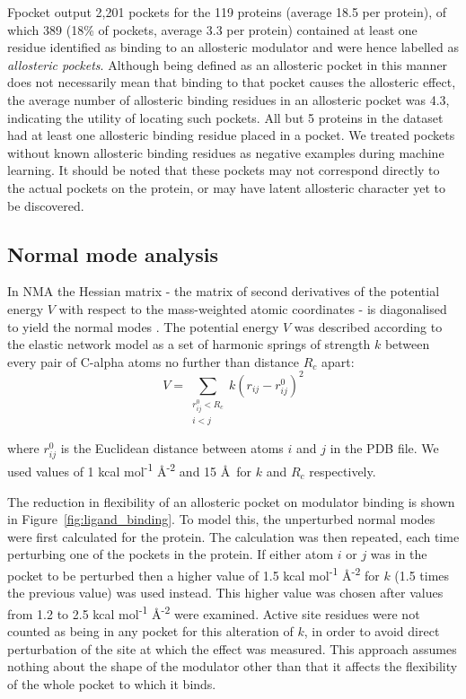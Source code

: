 Fpocket output 2,201 pockets for the 119 proteins (average 18.5 per protein), of which 389 (18\% of pockets, average 3.3 per protein) contained at least one residue identified as binding to an allosteric modulator and were hence labelled as \emph{allosteric pockets}.
Although being defined as an allosteric pocket in this manner does not necessarily mean that binding to that pocket causes the allosteric effect, the average number of allosteric binding residues in an allosteric pocket was 4.3, indicating the utility of locating such pockets.
All but 5 proteins in the dataset had at least one allosteric binding residue placed in a pocket.
We treated pockets without known allosteric binding residues as negative examples during machine learning.
It should be noted that these pockets may not correspond directly to the actual pockets on the protein, or may have latent allosteric character yet to be discovered.


\subsection{Normal mode analysis}

In NMA the Hessian matrix - the matrix of second derivatives of the potential energy $V$ with respect to the mass-weighted atomic coordinates - is diagonalised to yield the normal modes \cite{Hayward2008}.
The potential energy $V$ was described according to the elastic network model \cite{Tirion1996} as a set of harmonic springs of strength $k$ between every pair of C-alpha atoms no further than distance $R_{c}$ apart:
$$
V = \sum_{\substack{r_{ij}^{0} < R_{c} \\ i < j}} k (r_{ij} - r_{ij}^{0})^{2}
$$

where $r_{ij}^{0}$ is the Euclidean distance between atoms $i$ and $j$ in the PDB file.
We used values of 1 kcal mol\textsuperscript{-1} \AA\textsuperscript{-2} and 15 \AA\ for $k$ and $R_{c}$ respectively.

The reduction in flexibility of an allosteric pocket on modulator binding is shown in Figure~\ref{fig:ligand_binding}.
To model this, the unperturbed normal modes were first calculated for the protein.
The calculation was then repeated, each time perturbing one of the pockets in the protein.
If either atom $i$ or $j$ was in the pocket to be perturbed then a higher value of 1.5 kcal mol\textsuperscript{-1} \AA\textsuperscript{-2} for $k$ (1.5 times the previous value) was used instead.
This higher value was chosen after values from 1.2 to 2.5 kcal mol\textsuperscript{-1} \AA\textsuperscript{-2} were examined.
Active site residues were not counted as being in any pocket for this alteration of $k$, in order to avoid direct perturbation of the site at which the effect was measured.
This approach assumes nothing about the shape of the modulator other than that it affects the flexibility of the whole pocket to which it binds.

